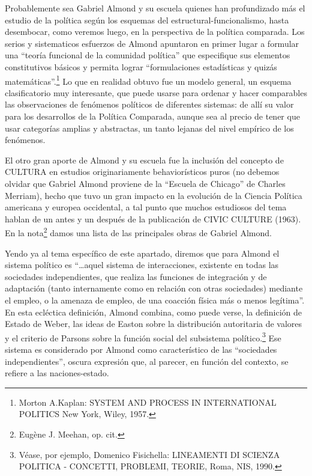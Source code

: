 \documentclass[
]{book}
\begin{document}
Probablemente sea Gabriel Almond y su escuela quienes han profundizado más el estudio de la política según los esquemas del estructural-funcionalismo, hasta desembocar, como veremos luego, en la perspectiva de la política comparada. Los serios y sistematicos esfuerzos de Almond apuntaron en primer lugar a formular una ``teoría funcional de la comunidad política'' que especifique sus elementos constitutivos básicos y permita lograr ``formulaciones estadísticas y quizás matemáticas''.\footnote{Morton A.Kaplan: SYSTEM AND PROCESS IN INTERNATIONAL POLITICS New York, Wiley, 1957.} Lo que en realidad obtuvo fue un modelo general, un esquema clasificatorio muy interesante, que puede usarse para ordenar y hacer comparables las observaciones de fenómenos políticos de diferentes sistemas: de allí su valor para los desarrollos de la Política Comparada, aunque sea al precio de tener que usar categorías amplias y abstractas, un tanto lejanas del nivel empírico de los fenómenos.

El otro gran aporte de Almond y su escuela fue la inclusión del concepto de CULTURA en estudios originariamente behaviorísticos puros (no debemos olvidar que Gabriel Almond proviene de la ``Escuela de Chicago'' de Charles Merriam), hecho que tuvo un gran impacto en la evolución de la Ciencia Política americana y europea occidental, a tal punto que muchos estudiosos del tema hablan de un antes y un después de la publicación de CIVIC CULTURE (1963). En la nota\footnote{Eugène J. Meehan, op. cit.} damos una lista de las principales obras de Gabriel Almond.

Yendo ya al tema específico de este apartado, diremos que para Almond el sistema político es ``\ldots aquel sistema de interacciones, existente en todas las sociedades independientes, que realiza las funciones de integración y de adaptación (tanto internamente como en relación con otras sociedades) mediante el empleo, o la amenaza de empleo, de una coacción física más o menos legítima''. En esta ecléctica definición, Almond combina, como puede verse, la definición de Estado de Weber, las ideas de Easton sobre la distribución autoritaria de valores y el criterio de Parsons sobre la función social del subsistema político.\footnote{Véase, por ejemplo, Domenico Fisichella: LINEAMENTI DI SCIENZA POLITICA - CONCETTI, PROBLEMI, TEORIE, Roma, NIS, 1990.} Ese sistema es considerado por Almond como característico de las ``sociedades independientes'', oscura expresión que, al parecer, en función del contexto, se refiere a las naciones-estado.
\end{document}
